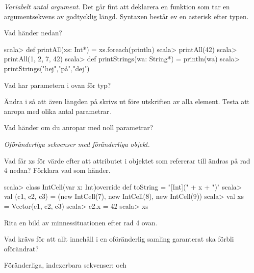 

\Exercise{\ExeWeekFIVE}

\begin{Goals}
\item 
\end{Goals}

\begin{Preparations}
\item 
\end{Preparations}

\BasicTasks %

\Task \emph{Variabelt antal argument.} Det går fint att deklarera en funktion som tar en argumentsekvens av godtycklig längd. Syntaxen består ev en asterisk \code{*} efter typen.

\Subtask Vad händer nedan?
\begin{REPL}
scala> def printAll(xs: Int*) = xs.foreach(println)
scala> printAll(42)
scala> printAll(1, 2, 7, 42)
scala> def printStrings(wa: String*) = println(wa)
scala> printStrings("hej","på","dej")
\end{REPL}

\Subtask Vad har parametern  i  ovan för typ?

\Subtask Ändra i  så att även längden på  skrivs ut före utskriften av alla element. Testa att anropa  med olika antal parametrar. 

\Subtask Vad händer om du anropar  med noll parametrar?

\Task \emph{Oföränderliga sekvenser med föränderliga objekt.} 

\Subtask Vad får xs för värde efter att attributet i objektet som  refererar till ändras på rad 4 nedan? Förklara vad som händer.
\begin{REPL}
scala> class IntCell(var x: Int){override def toString = "[Int](" + x + ")"}
scala> val (c1, c2, c3) = (new IntCell(7), new IntCell(8), new IntCell(9))
scala> val xs = Vector(c1, c2, c3)
scala> c2.x = 42
scala> xs
\end{REPL}

\Subtask\Pen Rita en bild av minnessituationen efter rad 4 ovan.

\Subtask\Pen Vad krävs för att allt innehåll i en oföränderlig samling garanterat ska förbli oförändrat? 

\Task Föränderliga, indexerbara sekvenser:  och 

